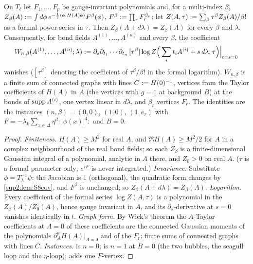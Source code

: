 \begin{lemma}\label{sup2:lem:S8torus}
On $T_\ell$ let $F_1,\dots,F_p$ be gauge-invariant polynomials and, for a multi-index $\beta$, $Z_\beta(A):=\int d\phi\,e^{-\frac12\langle\phi,H(A)\phi\rangle}F^\beta(\phi)$, $F^\beta:=\prod_rF_r^{\beta_r}$; let $Z(A,\tau):=\sum_\beta\tau^\beta Z_\beta(A)/\beta!$ as a formal power series in $\tau$. Then $Z_\beta(A+d\lambda)=Z_\beta(A)$ for every $\beta$ and $\lambda$. Consequently, for bond fields $A^{(1)},\dots,A^{(n)}$ and every $\beta$, the coefficient
\[
W_{n,\beta}(A^{(1)},\dots,A^{(n)};\lambda):=\partial_s\partial_{t_1}\cdots\partial_{t_n}\,[\tau^\beta]\log Z\Big(\sum_it_iA^{(i)}+s\,d\lambda,\tau\Big)\Big|_{t=s=0}
\]
vanishes ($[\tau^\beta]$ denoting the coefficient of $\tau^\beta/\beta!$ in the formal logarithm). $W_{n,\beta}$ is a finite sum of connected graphs with lines $C:= H(0)^{-1}$, vertices from the Taylor coefficients of $H(A)$ in $A$ (the vertices \cite[(1.8), (1.10)]{Ba3} with $g=1$ at background $B$) at the bonds of $\operatorname{supp} A^{(i)}$, one vertex linear in $d\lambda$, and $\beta_r$ vertices $F_r$. The identities \cite[(2.25)--(2.28)]{Ba3} are the instances $(n,\beta)=(0,0)$, $(1,0)$, $(1,e_r)$ with $F=-\lambda_k\sum_{x\in\Delta}\eta^d:\!|\phi(x)|^4\!:$ and $B=0$.
\end{lemma}

\begin{proof}
\emph{Finiteness.} $H(A)\ge M^2$ for real $A$, and $\Re H(A)\ge M^2/2$ for $A$ in a complex neighbourhood of the real bond fields; so each $Z_\beta$ is a finite-dimensional Gaussian integral of a polynomial, analytic in $A$ there, and $Z_0>0$ on real $A$. ($\tau$ is a formal parameter only; $e^{\tau F}$ is never integrated.) \emph{Invariance.} Substitute $\phi=T_\lambda^{-1}\psi$: the Jacobian is $1$ (orthogonal), the quadratic form changes by \cref{sup2:lem:S8cov}, and $F^\beta$ is unchanged; so $Z_\beta(A+d\lambda)=Z_\beta(A)$. \emph{Logarithm.} Every coefficient of the formal series $\log Z(A,\tau)$ is a polynomial in the $Z_\beta(A)/Z_0(A)$, hence gauge invariant in $A$, and its $\partial_s$-derivative at $s=0$ vanishes identically in $t$. \emph{Graph form.} By Wick's theorem the $A$-Taylor coefficients at $A=0$ of these coefficients are the connected Gaussian moments of the polynomials $\partial^a_AH(A)|_{A=0}$ and of the $F_r$: finite sums of connected graphs with lines $C$. \emph{Instances.} \cite[(2.25)]{Ba3} is $n=0$; \cite[(2.26)--(2.27)]{Ba3} is $n=1$ at $B=0$ (the two bubbles, the seagull loop and the $\eta$-loop); \cite[(2.28)]{Ba3} adds one $F$-vertex.
\end{proof}

